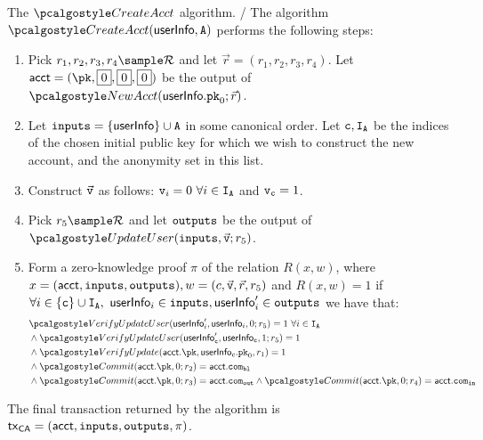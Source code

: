 \begin{boxfig}{\label{fig:createAcct}{The $\createAcct$ algorithm.}}
/ %
The algorithm $\createAcct(\userinfo, \anset)$ performs the following steps:
\begin{enumerate}
    \item Pick $r_1, r_2, r_3, r_4 \sample \randspace$ and let $\vec{r} = (r_1, r_2, r_3, r_4)$. Let $\acct = (\pk, \comm{0}, \comm{0}, \comm{0})$ be the output of $\newacc(\userinfo.\inpk; \vec{r})$.
    \item Let ${\textup{\texttt{inputs}}} = \{\textup{\textsf{userInfo}}\} \cup {\mathtt{A}}$ in some canonical order. Let $\mathtt{c}, \mathtt{I}_{\mathtt{A}}$ be the indices of the chosen initial public key for which we wish to construct the new account, and the anonymity set in this list. 
    \item Construct $\vec{\texttt{v}}$ as follows: $\texttt{v}_i = 0 \ \forall i \in \mathtt{I}_{\mathtt{A}}$ and $\texttt{v}_{\mathtt{c}} = 1$. 
    \item Pick $r_5 \sample \randspace$ and let ${\textup{\texttt{outputs}}}$ be the output of $\upduser(\inputs, \vec{\v} ;r_5)$.
    \item Form a zero-knowledge proof $\pi$ of the relation $R(x, w)$, where $x=(\textup{\textsf{acct}}, {\textup{\texttt{inputs}}}, {\textup{\texttt{outputs}}}), w = (c, \vec{\texttt{v}}, \vec{r}, r_5)$ and $R(x,w) = 1$ if 
    $\forall i \in \{\mathtt{c}\} \cup \mathtt{I}_{\mathtt{A}}, \ \textup{\textsf{userInfo}}_i \in {\textup{\texttt{inputs}}}, \textup{\textsf{userInfo}}'_i \in {\textup{\texttt{outputs}}}$
     we have that:
        {\begin{align*}
            & \verupduser(\userinfo'_i, \userinfo_i, 0;r_5) = 1 \ \forall i \in \ianset \\
            & \wedge \verupduser(\userinfo'_{\mathtt{c}}, \userinfo_{\mathtt{c}}, 1;r_5) = 1 \\
            & \wedge \verupd(\acct.\pk, \userinfo_c.\inpk, r_1) = 1\\
            & \wedge \commit(\acct.\pk, 0; r_2) = \acct.\com_\varbl \\
            & \wedge \commit(\acct.\pk, 0; r_3) = \acct.\com_\varout 
             \wedge \commit(\acct.\pk, 0; r_4) = \acct.\com_\varin \\
        \end{align*}}
\end{enumerate}
The final transaction returned by the algorithm is $\textup{\textsf{tx}}_\textsf{CA} = (\textup{\textsf{acct}}, {\textup{\texttt{inputs}}}, {\textup{\texttt{outputs}}}, \pi)$.
\end{boxfig}